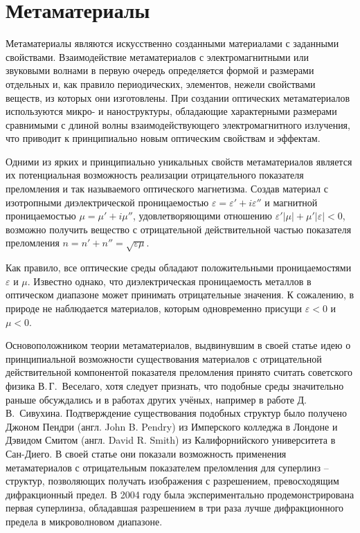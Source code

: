 \section{Метаматериалы}

Метаматериалы являются искусственно созданными материалами с заданными свойствами. Взаимодействие метаматериалов с электромагнитными или звуковыми \cite{Zhang2009} волнами в первую очередь определяется формой и размерами отдельных и, как правило периодических, элементов, нежели свойствами веществ, из которых они изготовлены. При создании оптических метаматериалов используются микро- и наноструктуры, обладающие характерными размерами сравнимыми с длиной волны взаимодействующего электромагнитного излучения, что приводит к принципиально новым оптическим свойствам и эффектам.

Одними из ярких и принципиально уникальных свойств метаматериалов является их потенциальная возможность реализации отрицательного показателя преломления и так называемого оптического магнетизма. Создав материал с изотропными диэлектрической проницаемостью $\varepsilon = \varepsilon' + i\varepsilon''$ и магнитной проницаемостью $\mu = \mu' + i\mu''$, удовлетворяющими отношению $\varepsilon'\left|\mu\right| + \mu'\left|\varepsilon\right| < 0$, возможно получить вещество с отрицательной действительной частью показателя преломления $n = n' + n'' = \sqrt{\varepsilon\mu}$. 

Как правило, все оптические среды обладают положительными проницаемостями $\varepsilon$ и $\mu$. Известно однако, что диэлектрическая проницаемость металлов в оптическом диапазоне может принимать отрицательные значения. К сожалению, в природе не наблюдается материалов, которым одновременно присущи $\varepsilon < 0$ и $\mu < 0$.

Основоположником теории метаматериалов, выдвинувшим в своей статье \cite{Veselago1967} идею о принципиальной возможности существования материалов с отрицательной действительной компонентой показателя преломления принято считать советского физика В.\,Г.~Веселаго, хотя следует признать, что подобные среды значительно раньше обсуждались и в работах других учёных, например в работе \cite{Sivoukhin1957} Д.\,В.~Сивухина. Подтверждение существования подобных структур было получено Джоном Пендри (англ. John B. Pendry) из Имперского колледжа в Лондоне и Дэвидом Смитом (англ. David R. Smith) из Калифорнийского университета в Сан-Диего. В своей статье \cite{Pendry2000} они показали возможность применения метаматериалов с отрицательным показателем преломления для суперлинз -- структур, позволяющих получать изображения с разрешением, превосходящим дифракционный предел. В 2004 году была экспериментально продемонстрирована \cite{Grbic2004} первая суперлинза, обладавшая разрешением в три раза лучше дифракционного предела в микроволновом диапазоне.